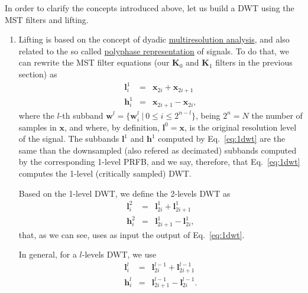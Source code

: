 In order to clarify the concepts introduced above, let us build a
DWT using the MST filters and lifting.

\begin{enumerate}

\item Lifting is based on the concept of dyadic
  \href{https://en.wikipedia.org/wiki/Multiresolution_analysis}{multiresolution
    analysis}, and also related to the so called
  \href{https://en.wikipedia.org/wiki/Polyphase_matrix}{polyphase
    representation} of signals. To do that, we can rewrite
  the MST filter equations (our ${\mathbf K}_0$ and ${\mathbf K}_1$
  filters in the previous section) as
  \begin{equation}
    \begin{array}{rcl}
      {\mathbf l}^1_i & = & {\mathbf x}_{2i} + {\mathbf x}_{2i+1} \\
      {\mathbf h}^1_i & = & {\mathbf x}_{2i+1} - {\mathbf x}_{2i},
    \end{array}
    \label{eq:1dwt}
  \end{equation}
  where the $l$-th subband
  ${\mathbf w}^l=\{{\mathbf w}_i^l~|~0\le i\le 2^{n-l}\}$, being
  $2^n=N$ the number of samples in ${\mathbf x}$, and where, by
  definition, ${\mathbf l}^0={\mathbf x}$, is the original resolution
  level of the signal. The subbands ${\mathbf l}^1$ and
  ${\mathbf h}^1$ computed by Eq.~\eqref{eq:1dwt} are the same than
  the downsampled (also refered as decimated) subbands computed by the
  corresponding 1-level PRFB, and we say, therefore, that
  Eq.~\eqref{eq:1dwt} computes the 1-level (critically sampled) DWT.

  Based on the 1-level DWT, we define the 2-levels DWT as
  \begin{equation}
    \begin{array}{rcl}
      {\mathbf l}^2_i & = & {\mathbf l}^1_{2i} + {\mathbf l}^1_{2i+1} \\
      {\mathbf h}^2_i & = & {\mathbf l}^1_{2i+1} - {\mathbf l}^1_{2i},
    \end{array}
    \label{eq:2dwt}
  \end{equation}
  that, as we can see, uses as input the output of Eq.~\eqref{eq:1dwt}.

  In general, for a $l$-levels DWT, we use
    \begin{equation}
    \begin{array}{rcl}
      {\mathbf l}^l_i & = & {\mathbf l}^{l-1}_{2i} + {\mathbf l}^{l-1}_{2i+1} \\
      {\mathbf h}^l_i & = & {\mathbf l}^{l-1}_{2i+1} - {\mathbf l}^{l-1}_{2i}.
    \end{array}
    \label{eq:ldwt}
  \end{equation}


\end{enumerate}

